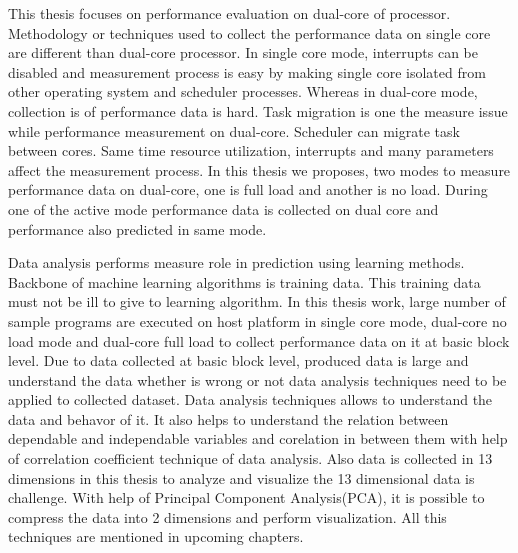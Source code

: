 \par This thesis focuses on performance evaluation on dual-core of processor. Methodology  or techniques used to collect the performance data on single core are different than dual-core processor. In single core mode, interrupts can be disabled and measurement process is easy by making single core isolated from other operating system and scheduler processes. Whereas in dual-core mode, collection is of performance data is hard. Task migration is one the measure issue while performance measurement on dual-core. Scheduler can migrate task between cores. Same time resource utilization, interrupts and many parameters affect the measurement process. In this thesis we proposes, two modes to measure performance data on dual-core, one is full load and another is no load. During one of the active mode performance data is collected on dual core and performance also predicted in same mode. 

\par Data analysis performs measure role in prediction using learning methods. Backbone of machine learning algorithms is training data. This training data must not be ill to give to learning algorithm. In this thesis work, large number of sample programs are executed on host platform in single core mode, dual-core no load mode and dual-core full load to collect performance data on it at basic block level. Due to data collected at basic block level, produced data is large and understand the data whether is wrong or not data analysis techniques need to be applied to collected dataset. Data analysis techniques allows to understand the data and behavor of it. It also helps to understand the relation between dependable and independable variables and corelation in between them with help of correlation coefficient technique of data analysis. Also data is collected in 13 dimensions in this thesis to analyze and visualize the 13 dimensional data is challenge. With help of Principal Component Analysis(PCA), it is possible to compress the data into 2 dimensions and perform visualization. All this techniques are mentioned in upcoming chapters. 



